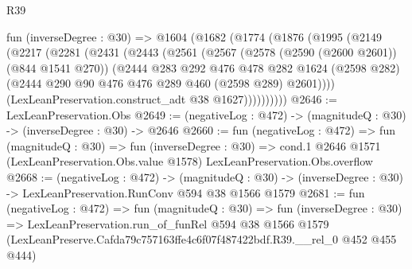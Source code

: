 \begin{lexlean}{R39}
\begin{coremodule}
  fun (inverseDegree : @30) =>
  @1604
    (@1682
      (@1774
        (@1876
          (@1995
            (@2149
              (@2217
                (@2281
                  (@2431
                    (@2443
                      (@2561
                        (@2567
                          (@2578 (@2590 (@2600 @2601)) (@844 @1541 @270))
                          (@2444
                            @283
                            @292
                            @476
                            @478
                            @282
                            @1624
                            (@2598 @282)
                            (@2444 @290 @90 @476 @476 @289 @460 (@2598 @289) @2601))))
                      (LexLeanPreservation.construct_adt @38 @1627))))))))))
@2646 := LexLeanPreservation.Obs
@2649 := (negativeLog : @472) -> (magnitudeQ : @30) -> (inverseDegree : @30) -> @2646
@2660 := fun (negativeLog : @472) =>
  fun (magnitudeQ : @30) =>
  fun (inverseDegree : @30) =>
  cond.{1} @2646 @1571 (LexLeanPreservation.Obs.value @1578) LexLeanPreservation.Obs.overflow
@2668 := (negativeLog : @472) ->
  (magnitudeQ : @30) -> (inverseDegree : @30) -> LexLeanPreservation.RunConv @594 @38 @1566 @1579
@2681 := fun (negativeLog : @472) =>
  fun (magnitudeQ : @30) =>
  fun (inverseDegree : @30) =>
  LexLeanPreservation.run_of_funRel
    @594
    @38
    @1566
    @1579
    (LexLeanPreserve.Cafda79c757163ffe4c6f07f487422bdf.R39.__rel_0 @452 @455 @444)
\end{coremodule}
\end{lexlean}
